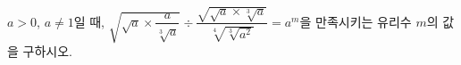$a>0$, $a\ne 1$일 때, $\sqrt{\sqrt{a}\times\dfrac{a}{\sqrt[3]{a}}}\div\dfrac{\sqrt{\sqrt{a}\times\sqrt[3]{a}}}{\sqrt[4]{\sqrt[3]{a^2}}}=a^m$을 만족시키는 유리수 $m$의 값을 구하시오.
